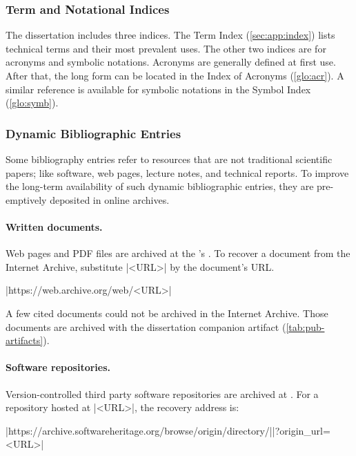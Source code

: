 \subsubsection{Term and Notational Indices}

The dissertation includes three indices.
The Term Index (\autoref{sec:app:index}) lists technical terms and their most prevalent uses.
The other two indices are for acronyms and symbolic notations.
Acronyms are generally defined at first use.
After that, the long form can be located in the Index of Acronyms (\autoref{glo:acr}).
A similar reference is available for symbolic notations in the Symbol Index (\autoref{glo:symb}).

\subsubsection{Dynamic Bibliographic Entries}

Some bibliography entries refer to resources that are not traditional scientific papers;
like software, web pages, lecture notes, and technical reports.
To improve the long-term availability of such dynamic bibliographic entries, they are pre-emptively deposited in online archives.

\paragraph*{Written documents.}
Web pages and PDF files are archived at the 's .
To recover a document from the Internet Archive, substitute \pr|<URL>| by the document's URL.
\begin{center}\pr|https://web.archive.org/web/<URL>|\end{center}
A few cited documents could not be archived in the Internet Archive.
Those documents are archived with the dissertation companion artifact (\autoref{tab:pub-artifacts}).

\paragraph*{Software repositories.}
Version-controlled third party software repositories are archived at
\href{https://softwareheritage.org}{}.
For a repository hosted at \pr|<URL>|, the recovery address is:%
\begin{center}\pr|https://archive.softwareheritage.org/browse/origin/directory/|\mbox{\pr|?origin_url=<URL>|}\end{center}


